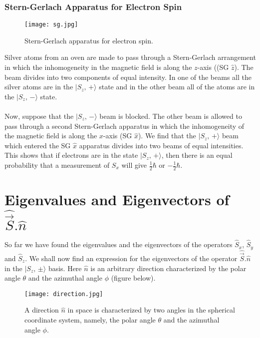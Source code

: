 \newpage

\subsubsection{Stern-Gerlach Apparatus for Electron Spin}

\begin{figure}[h]
	\centering
	\texttt{[image: sg.jpg]}
	\vspace{-0.4 cm}
	\caption{Stern-Gerlach apparatus for electron spin. }
	\label{sg}
\end{figure}

Silver atoms from an oven are made to pass through a Stern-Gerlach arrangement in which the inhomogeneity in the magnetic field is 
along the $z$-axis ((SG $\hat{z}$). The beam divides into two components of equal intensity. In one of the beams all the silver atoms are in the $|S_z,\, +\rangle$ state and in the other beam all of the atoms are in the $|S_z,\,-\rangle$ state. 

\paragraph{}
Now, suppose that the $|S_z,\,-\rangle$ beam is blocked. The other beam is allowed to pass through a second Stern-Gerlach apparatus in which the inhomogeneity of the magnetic field is along the $x$-axis (SG $\hat{x}$). We find that the $|S_z,\,+\rangle$
beam which entered the SG $\hat{x}$ apparatus divides into two beams of equal intensities. This shows that if electrons are in  the state  $|S_z,\,+ \rangle$, then there is an equal probability that a
measurement of $S_x$ will give $\frac{1}{2}\hbar$ or $-\frac{1}{2}\hbar$.

\newpage

\section{Eigenvalues and Eigenvectors of $\hat{\vec{S}}. \hat{n}$ }
So far we have found the eigenvalues and the eigenvectors of the operators $\hat{S}_x$, $\hat{S}_y$ and
$\hat{S}_z$. We shall now find an expression for the eigenvectors of the operator $\hat{\vec{S}}.\hat{n}$ in the 
$|S_z,\, \pm\rangle$ basis. Here $\hat{n}$ is an arbitrary direction characterized by the polar angle $\theta$ and the azimuthal angle $\phi$ (figure below).
\begin{figure}[h]
	\centering
	\texttt{[image: direction.jpg]}
	\vspace{-0.5 cm}
	\caption{A direction $\hat{n}$ in space is characterized by two angles in the spherical coordinate system, namely, the polar angle
		$\theta$ and the azimuthal angle $\phi$. }
	\label{fig:direction}
\end{figure}

